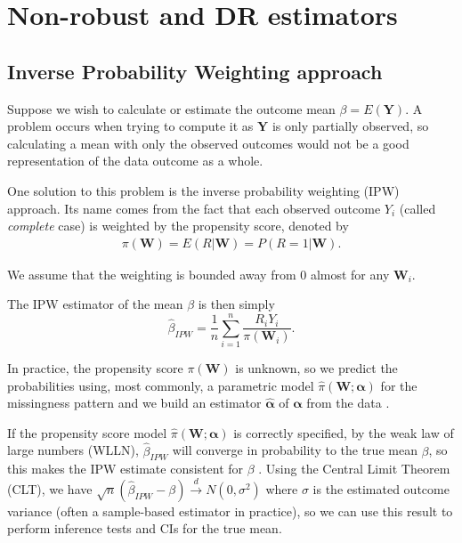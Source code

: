 \documentclass[12pt,twoside]{article}
\begin{document}
\clearpage
\section{Non-robust and DR estimators}

\subsection{Inverse Probability Weighting approach}

Suppose we wish to calculate or estimate the outcome mean $\beta = E(\mathbf{Y})$. A problem occurs when trying to compute it as $\mathbf{Y}$ is only partially observed, so calculating a mean with only the observed outcomes would not be a good representation of the data outcome as a whole.

One solution to this problem is the inverse probability weighting (IPW) approach. Its name comes from the fact that each observed outcome $Y_i$ (called \textit{complete} case) is weighted by the propensity score, denoted by
\begin{align*}
    \pi(\mathbf{W})= E(R|\mathbf{W}) = P(R = 1|\mathbf{W}).
\end{align*}

We assume that the weighting is bounded away from 0 almost for any $\mathbf{W}_i$.

The IPW estimator of the mean $\beta$ is then simply 
\begin{equation} \label{IPW_est}
    \hat{\beta}_{IPW} = \frac{1}{n} \sum_{i=1}^{n} \frac{R_iY_i}{\pi(\mathbf{W}_i)}.
\end{equation}

In practice, the propensity score $\pi(\mathbf{W})$ is unknown, so we predict the probabilities using, most commonly, a parametric model $\hat\pi(\mathbf{W}; \boldsymbol\alpha)$ for the missingness pattern and we build an estimator $\hat{\boldsymbol\alpha}$ of $\boldsymbol\alpha$ from the data \citep{vansteelandt}.

If the propensity score model $\hat\pi(\mathbf{W}; \boldsymbol\alpha)$ is correctly specified, by the weak law of large numbers (WLLN), $\hat{\beta}_{IPW}$ will converge in probability to the true mean $\beta$, so this makes the IPW estimate consistent for $\beta$ \citep{davidian}. Using the Central Limit Theorem (CLT), we have $\sqrt{n}(\hat{\beta}_{IPW}-\beta) \xrightarrow{d} N(0,\sigma^2)$ where $\sigma$ is the estimated outcome variance (often a sample-based estimator in practice), so we can use this result to perform inference tests and CIs for the true mean.
\end{document}
